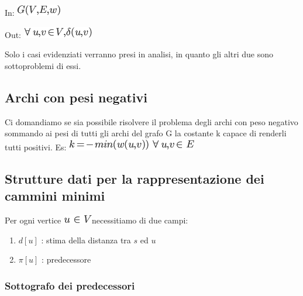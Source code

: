 \documentclass{article}
\providecommand{\tightlist}{%
  \setlength{\itemsep}{0pt}\setlength{\parskip}{0pt}}
\begin{document}
{In: }\includegraphics{images/image505.png}

{Out: }\includegraphics{images/image506.png}

{}

{Solo i casi evidenziati verranno presi in analisi, in quanto gli altri
due sono sottoproblemi di essi.}

{}

\subsection{\texorpdfstring{{Archi con pesi negativi}}{Archi con pesi negativi}}\label{h.tf12b72w5l3}

{Ci domandiamo se sia possibile risolvere il problema degli archi con
peso negativo sommando ai pesi di tutti gli archi del grafo G la
costante k capace di renderli tutti positivi. Es:
}\includegraphics{images/image507.png}

\subsection{\texorpdfstring{{Strutture dati per la rappresentazione dei cammini minimi}}{Strutture dati per la rappresentazione dei cammini minimi}}\label{h.ee7q1txmgnne}

{}

{Per ogni vertice }\includegraphics{images/image508.png}{necessitiamo di
due campi:}

\begin{enumerate}
\tightlist
\item
$d[u]$ : stima della distanza tra $s$ ed $u$
\item
$\pi[u]$ : predecessore
\end{enumerate}

\subsubsection{\texorpdfstring{{Sottografo dei predecessori}}{Sottografo dei predecessori}}\label{h.ky1vo2u762au}
\end{document}
